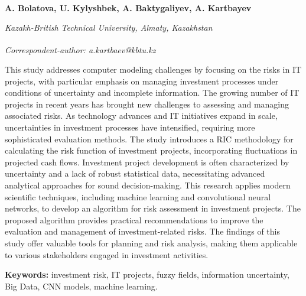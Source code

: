 
\begin{articleheader}

{\bfseries
A. Bolatova,
U. Kylyshbek,
A. Baktygaliyev,
A. Kartbayev\textsuperscript{\envelope } }
\end{articleheader}

\begin{affiliation}
\emph{Kazakh-British Technical University, Almaty, Kazakhstan}

\raggedright \textsuperscript{\envelope }{\em Correspondent-author: a.kartbaev@kbtu.kz}
\end{affiliation}

This study addresses computer modeling challenges by focusing on the
risks in IT projects, with particular emphasis on managing investment
processes under conditions of uncertainty and incomplete information.
The growing number of IT projects in recent years has brought new
challenges to assessing and managing associated risks. As technology
advances and IT initiatives expand in scale, uncertainties in investment
processes have intensified, requiring more sophisticated evaluation
methods. The study introduces a RIC methodology for calculating the risk
function of investment projects, incorporating fluctuations in projected
cash flows. Investment project development is often characterized by
uncertainty and a lack of robust statistical data, necessitating
advanced analytical approaches for sound decision-making. This research
applies modern scientific techniques, including machine learning and
convolutional neural networks, to develop an algorithm for risk
assessment in investment projects. The proposed algorithm provides
practical recommendations to improve the evaluation and management of
investment-related risks. The findings of this study offer valuable
tools for planning and risk analysis, making them applicable to various
stakeholders engaged in investment activities.

{\bfseries Keywords:} investment risk, IT projects, fuzzy fields,
information uncertainty, Big Data, CNN models, machine learning.

